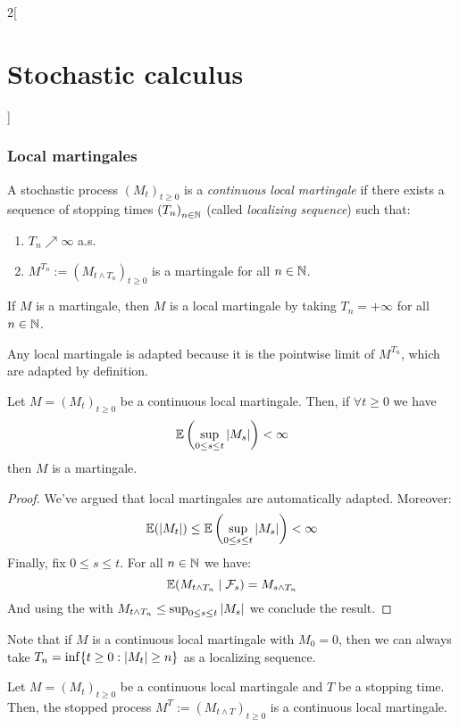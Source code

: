 \documentclass[../../../main_math.tex]{subfiles}
\begin{document}
\begin{multicols}{2}[\section{Stochastic calculus}]
  \subsubsection{Local martingales}
  \begin{definition}
    A stochastic process ${(M_t)}_{t\geq 0}$ is a \emph{continuous local martingale} if there exists a sequence of stopping times ${(T_n)}_{n\in\mathbb{N}}$ (called \emph{localizing sequence}) such that:
    \begin{enumerate}
      \item $T_n\nearrow \infty$ a.s.
      \item $M^{T_n}:={(M_{t\wedge T_n})}_{t\geq 0}$ is a martingale for all $n\in\mathbb{N}$.
    \end{enumerate}
  \end{definition}
  \begin{remark}
    If $M$ is a martingale, then $M$ is a local martingale by taking $T_n=+\infty$ for all $n\in\mathbb{N}$.
  \end{remark}
  \begin{remark}
    Any local martingale is adapted because it is the pointwise limit of $M^{T_n}$, which are adapted by definition.
  \end{remark}
  \begin{proposition}
    Let $M={(M_t)}_{t\geq 0}$ be a continuous local martingale. Then, if $\forall t\geq 0$ we have
    $$
      \mathbb{E}\left(\sup_{0\leq s\leq t}\abs{M_s}\right)<\infty
    $$
    then $M$ is a martingale.
  \end{proposition}
  \begin{proof}
    We've argued that local martingales are automatically adapted. Moreover:
    $$
      \mathbb{E}(\abs{M_t})\leq \mathbb{E}\left(\sup_{0\leq s\leq t}\abs{M_s}\right)<\infty
    $$
    Finally, fix $0\leq s\leq t$. For all $n\in\mathbb{N}$ we have:
    $$
      \mathbb{E}(M_{t\wedge T_n}\mid \mathcal{F}_s)=M_{s\wedge T_n}
    $$
    And using the  with $M_{t\wedge T_n}\leq \sup_{0\leq s\leq t}\abs{M_s}$ we conclude the result.
  \end{proof}
  \begin{remark}
    Note that if $M$ is a continuous local martingale with $M_0=0$, then we can always take $T_n=\inf\{t\geq 0:\abs{M_t}\geq n\}$ as a localizing sequence.
  \end{remark}
  \begin{theorem}
    Let $M={(M_t)}_{t\geq 0}$ be a continuous local martingale and $T$ be a stopping time. Then, the stopped process $M^T:={(M_{t\wedge T})}_{t\geq 0}$ is a continuous local martingale.

\end{theorem}
\end{multicols}
\end{document}
